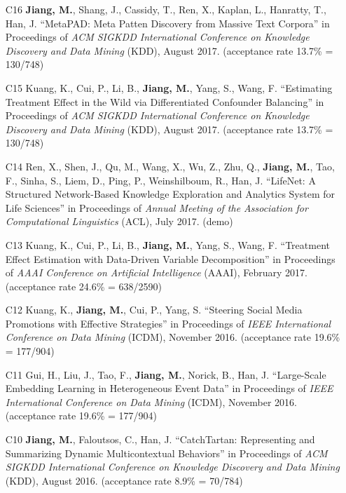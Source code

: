 \documentclass[10pt]{article}
\newenvironment{myindentpar}[1]%
{\begin{list}{}%
         {\setlength{\leftmargin}{#1}}%
         \item[]%
}
{\end{list}}
\newcounter{list}
\begin{document}
\begin{myindentpar}{0.00cm}
\begin{enumerate}[leftmargin=.5cm]
\item[C16] \textbf{Jiang, M.}, Shang, J., Cassidy, T., Ren, X., Kaplan, L., Hanratty, T., Han, J. ``MetaPAD: Meta Patten Discovery from Massive Text Corpora'' in Proceedings of \textit{ACM SIGKDD International Conference on Knowledge Discovery and Data Mining} (KDD), August 2017. (acceptance rate 13.7\% = 130/748)

\item[C15] Kuang, K., Cui, P., Li, B., \textbf{Jiang, M.}, Yang, S., Wang, F. ``Estimating Treatment Effect in the Wild via Differentiated Confounder Balancing'' in Proceedings of \textit{ACM SIGKDD International Conference on Knowledge Discovery and Data Mining} (KDD), August 2017. (acceptance rate 13.7\% = 130/748)

\item[C14] Ren, X., Shen, J., Qu, M., Wang, X., Wu, Z., Zhu, Q., \textbf{Jiang, M.}, Tao, F., Sinha, S., Liem, D., Ping, P., Weinshilboum, R., Han, J. ``LifeNet: A Structured Network-Based Knowledge Exploration and Analytics System for Life Sciences'' in Proceedings of \textit{Annual Meeting of the Association for Computational Linguistics} (ACL), July 2017. (demo)

\item[C13] Kuang, K., Cui, P., Li, B., \textbf{Jiang, M.}, Yang, S., Wang, F. ``Treatment Effect Estimation with Data-Driven Variable Decomposition'' in Proceedings of \textit{AAAI Conference on Artificial Intelligence} (AAAI), February 2017. (acceptance rate 24.6\% = 638/2590)

\item[C12] Kuang, K., \textbf{Jiang, M.}, Cui, P., Yang, S. ``Steering Social Media Promotions with Effective Strategies'' in Proceedings of \textit{IEEE International Conference on Data Mining} (ICDM), November 2016. (acceptance rate 19.6\% = 177/904)

\item[C11] Gui, H., Liu, J., Tao, F., \textbf{Jiang, M.}, Norick, B., Han, J. ``Large-Scale Embedding Learning in Heterogeneous Event Data'' in Proceedings of \textit{IEEE International Conference on Data Mining} (ICDM), November 2016. (acceptance rate 19.6\% = 177/904)

\item[C10] \textbf{Jiang, M.}, Faloutsos, C., Han, J. ``CatchTartan: Representing and Summarizing Dynamic Multicontextual Behaviors'' in Proceedings of \textit{ACM SIGKDD International Conference on Knowledge Discovery and Data Mining} (KDD), August 2016. (acceptance rate 8.9\% = 70/784)


\end{enumerate}
\end{myindentpar}
\end{document}
